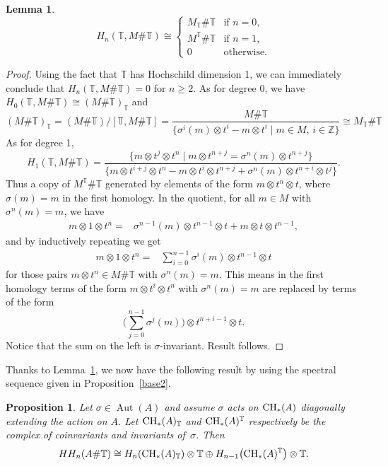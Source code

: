 \documentclass[pdftex]{sigma}
\newcommand{\B}[1]{\mathbb{#1}}
\newcommand{\CH}{{\rm CH}}
\renewcommand{\geq}{\geqslant}
\numberwithin{equation}{section}
\newtheorem{Lemma}[Theorem]{Lemma}
\newtheorem{Proposition}[Theorem]{Proposition}
 { \theoremstyle{definition}
\newtheorem{Definition}[Theorem]{Definition}
\newtheorem{Example}[Theorem]{Example}
\newtheorem{Remark}[Theorem]{Remark} }
\begin{document}
\begin{Lemma}\label{lem:LocalizedCoefficients}
 \begin{equation*}
 H_n(\B{T},M\#\B{T}) \cong
 \begin{cases}
 M_{\B{T}}\#\B{T} & \text{if } n=0,\\
 M^{\B{T}}\#\B{T} & \text{if } n=1,\\
 0 & \text{otherwise.}
 \end{cases}
 \end{equation*}
\end{Lemma}
\begin{proof}
 Using the fact that $\B{T}$ has Hochschild dimension 1, we can immediately conclude that $H_n(\B{T},M\#\B{T})=0$ for $n\geq 2$. As for degree 0, we have
 $H_0(\B{T},M\#\B{T}) \cong (M\#\B{T})_{\B{T}}$ and
 \[ (M\#\B{T})_{\B{T}}
 = (M\#\B{T})/[\B{T},M\# \B{T}]=\frac{M\#\B{T}}{\big\{\sigma^i(m)\otimes t^{i}-m\otimes t^i\mid m\in M,\, i\in\B{Z} \big\}}
 \cong M_{\B{T}}\# \B{T}
 \]
 As for degree 1,
 \[ H_1(\B{T},M\#\B{T})
 = \frac{\big\{m\otimes t^j\otimes t^n\mid m\otimes t^{n+j} = \sigma^{n}(m)\otimes t^{n+j}\big\}}
 {\big\{m\otimes t^{i+j}\otimes t^n - m\otimes t^i\otimes t^{n+j} + \sigma^n(m)\otimes t^{n+i}\otimes t^j \big\} }.
 \]
 Thus a copy of $M^{\B{T}}\#\B{T}$ generated by elements of the form $m\otimes t^n\otimes t$, where
 $\sigma(m)=m$ in the first homology. In the quotient, for all $m\in M$ with $\sigma^n(m)=m$, we
 have
 \begin{align*}
 m\otimes 1\otimes t^n
 = & \sigma^{n-1}(m)\otimes t^{n-1}\otimes t + m\otimes t\otimes t^{n-1},
 \end{align*}
 and by inductively repeating we get
 \begin{align*}
 m\otimes 1\otimes t^n
 = & \sum_{i=0}^{n-1} \sigma^i(m)\otimes t^{n-1}\otimes t
 \end{align*}
 for those pairs $m\otimes t^n\in M\#\B{T}$ with $\sigma^n(m)=m$. This means in the first homology
 terms of the form $m\otimes t^i\otimes t^n$ with $\sigma^n(m)=m$ are replaced by terms of the form
 \[ \Biggl(\sum_{j=0}^{n-1}\sigma^j(m)\Biggr)\otimes t^{n+i-1}\otimes t .
 \]
 Notice that the sum on the left is $\sigma$-invariant. Result follows.
\end{proof}

Thanks to Lemma~\ref{lem:LocalizedCoefficients}, we now have the following result by using
 the spectral sequence given in Proposition~\ref{base2}.
\begin{Proposition}\label{prop:torus-action}
 Let $\sigma\in \operatorname{Aut}(A)$ and assume $\sigma$ acts on $\CH_*(A)$ diagonally extending the
 action on $A$. Let $\CH_*(A)_{\B{T}}$ and $\CH_*(A)^{\B{T}}$ respectively be the complex
 of coinvariants and invariants of~$\sigma$. Then
 \[ HH_n(A\# \B{T})
 \cong H_n(\CH_*(A)_{\B{T}})\otimes \B{T} \oplus H_{n-1}\bigl(\CH_*(A)^{\B{T}}\bigr)\otimes \B{T}.
 \]
\end{Proposition}
\end{document}
